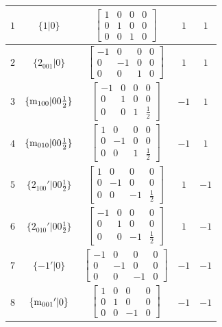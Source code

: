 \documentclass[fleqn,8pt]{jsarticle}
\begin{document}
\begin{longtable}{ccccc}
$ 1 $ & $ \{1|0\} $ & $ \begin{bmatrix} 1 & 0 & 0 & 0 \\ 0 & 1 & 0 & 0 \\ 0 & 0 & 1 & 0 \end{bmatrix} $ & $ 1 $ & $ 1 $ \\ \hline
$ 2 $ & $ \{2{}_{001}|0\} $ & $ \begin{bmatrix} -1 & 0 & 0 & 0 \\ 0 & -1 & 0 & 0 \\ 0 & 0 & 1 & 0 \end{bmatrix} $ & $ 1 $ & $ 1 $ \\ \hline
$ 3 $ & $ \{{\rm m}_{100}|0 0 \frac{1}{2}\} $ & $ \begin{bmatrix} -1 & 0 & 0 & 0 \\ 0 & 1 & 0 & 0 \\ 0 & 0 & 1 & \frac{1}{2} \end{bmatrix} $ & $ -1 $ & $ 1 $ \\ \hline
$ 4 $ & $ \{{\rm m}_{010}|0 0 \frac{1}{2}\} $ & $ \begin{bmatrix} 1 & 0 & 0 & 0 \\ 0 & -1 & 0 & 0 \\ 0 & 0 & 1 & \frac{1}{2} \end{bmatrix} $ & $ -1 $ & $ 1 $ \\ \hline
$ 5 $ & $ \{2{}_{100}{}'|0 0 \frac{1}{2}\} $ & $ \begin{bmatrix} 1 & 0 & 0 & 0 \\ 0 & -1 & 0 & 0 \\ 0 & 0 & -1 & \frac{1}{2} \end{bmatrix} $ & $ 1 $ & $ -1 $ \\ \hline
$ 6 $ & $ \{2{}_{010}{}'|0 0 \frac{1}{2}\} $ & $ \begin{bmatrix} -1 & 0 & 0 & 0 \\ 0 & 1 & 0 & 0 \\ 0 & 0 & -1 & \frac{1}{2} \end{bmatrix} $ & $ 1 $ & $ -1 $ \\ \hline
$ 7 $ & $ \{-1{}'|0\} $ & $ \begin{bmatrix} -1 & 0 & 0 & 0 \\ 0 & -1 & 0 & 0 \\ 0 & 0 & -1 & 0 \end{bmatrix} $ & $ -1 $ & $ -1 $ \\ \hline
$ 8 $ & $ \{{\rm m}_{001}{}'|0\} $ & $ \begin{bmatrix} 1 & 0 & 0 & 0 \\ 0 & 1 & 0 & 0 \\ 0 & 0 & -1 & 0 \end{bmatrix} $ & $ -1 $ & $ -1 $ \\ \hline

\end{longtable}
\end{document}
